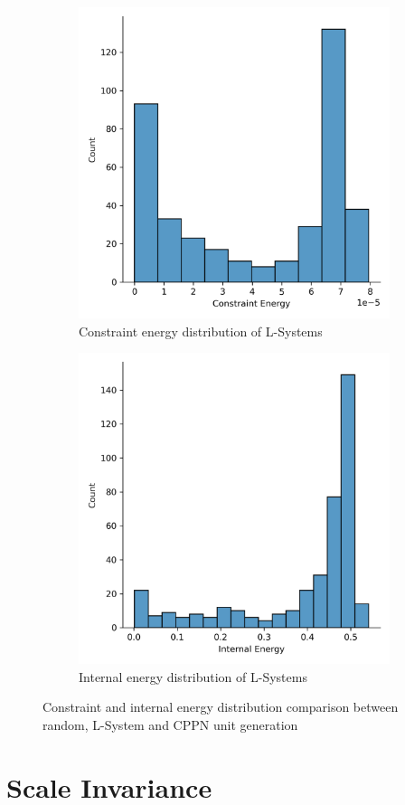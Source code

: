 \begin{figure}[H]
	\centering
	\begin{subfigure}[c]{0.45\textwidth}
		\centering
		\includegraphics[width=\textwidth]{ce_ls.png}
		\caption{Constraint energy distribution of L-Systems}
	\end{subfigure}
	\hfill
	\begin{subfigure}[c]{0.45\textwidth}
		\centering
		\includegraphics[width=\textwidth]{ie_ls.png}
		\caption{Internal energy distribution of L-Systems}
	\end{subfigure}
	\caption[Constraint and internal energy distribution comparison]{Constraint and internal energy distribution comparison between random, L-System and CPPN unit generation}
	\label{fig:ciecomp}
\end{figure}

\section{Scale Invariance}